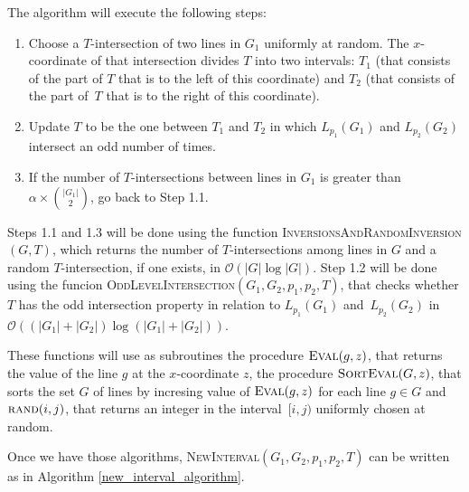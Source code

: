 \documentclass{article}
\def\bigo{\mathcal{O}}
\begin{document}
The algorithm will execute the following steps:

\begin{enumerate}[label=1.{\arabic*}.]
    \item Choose a $T$-intersection of two lines in $G_1$ uniformly at random. The $x$-coordinate of that intersection divides $T$ into two intervals: $T_1$ (that consists of the part of $T$ that is to the left of this coordinate) and $T_2$ (that consists of the part of~$T$ that is to the right of this coordinate).
    \item Update $T$ to be the one between $T_1$ and $T_2$ in which $L_{p_1}(G_1)$ and $L_{p_2}(G_2)$ intersect an odd number of times. 
    \item If the number of $T$-intersections between lines in $G_1$ is greater than $\alpha \times {|G_1| \choose 2}$, go back to Step 1.1.
\end{enumerate}

Steps 1.1 and 1.3 will be done using the function \textsc{InversionsAndRandomInversion}$(G,T)$, which returns the number of $T$-intersections among lines in $G$ and a random $T$-intersection, if one exists, in $\bigo(|G| \log |G|)$. Step 1.2 will be done using the funcion \textsc{OddLevelIntersection}$(G_1,G_2,p_1,p_2,T)$, that checks whether $T$ has the odd intersection property in relation to $L_{p_1}(G_1)$ and~$L_{p_2}(G_2)$ in $\bigo ((|G_1|+|G_2|) \log (|G_1|+|G_2|))$.

These functions will use as subroutines the procedure $\textsc{Eval}(g,z)$, that returns the value of the line $g$ at the $x$-coordinate $z$, the procedure $\textsc{SortEval}(G,z)$, that sorts the set $G$ of lines by incresing value of $\textsc{Eval}(g,z)$ for each line $g \in G$ and $\textsc{rand}(i,j)$, that returns an integer in the interval~$[i,j)$ uniformly chosen at random.

Once we have those algorithms, \textsc{NewInterval}$(G_1,G_2,p_1,p_2,T)$ can be written as in Algorithm \ref{new_interval_algorithm}.

\newpage
\end{document}
